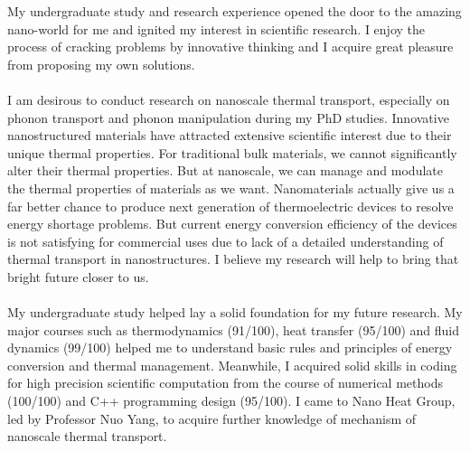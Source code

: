 \documentclass[a4paper,10pt]{article}
\begin{document}
\begin{spacing}{1.5}
\vspace{1.5em}
My undergraduate study and research experience opened the door to the amazing nano-world for me and ignited my interest in scientific research. I enjoy the process of cracking problems by innovative thinking and I acquire great pleasure from proposing my own solutions. \\
\\
I am desirous to conduct research on nanoscale thermal transport, especially on phonon transport and phonon manipulation during my PhD studies. Innovative nanostructured materials have attracted extensive scientific interest due to their unique thermal properties. For traditional bulk materials, we cannot significantly alter their thermal properties. But at nanoscale, we can manage and modulate the thermal properties of materials as we want. Nanomaterials actually give us a far better chance to produce next generation of thermoelectric devices to resolve energy shortage problems. But current energy conversion efficiency of the devices is not satisfying for commercial uses due to lack of a detailed understanding of thermal transport in nanostructures. I believe my research will help to bring that bright future closer to us.\\
\\
My undergraduate study helped lay a solid foundation for my future research. My major courses such as thermodynamics (91/100), heat transfer (95/100) and fluid dynamics (99/100) helped me to understand basic rules and principles of energy conversion and thermal management. Meanwhile, I acquired solid skills in coding for high precision scientific computation from the course of numerical methods (100/100) and C++ programming design (95/100). I came to Nano Heat Group, led by Professor Nuo Yang, to acquire further knowledge of mechanism of nanoscale thermal transport.\\
\\

\end{spacing}
\end{document}
